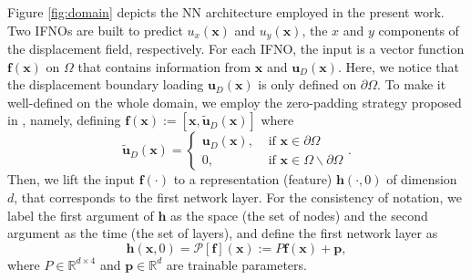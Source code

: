\documentclass[twocolumn,10pt]{asme2ej}
\renewcommand{\~}{\tilde}
\renewcommand{\-}{\bar}
\newcommand{\8}{\infty}
\numberwithin{equation}{section}
\newcommand{\real}{\mathbb{R}}
\def\omg{{\Omega}}
\def \fb{\bm{f}}
\def \ub{\bm{u}}
\def \xb{\bm{x}}
\def \hb{\bm{h}}
\def \pb{\bm{p}}
\begin{document}
    Figure \ref{fig:domain} depicts the NN architecture employed in the present work. Two IFNOs are built to predict $u_x(\xb)$ and $u_y(\xb)$, the $x$ and $y$ components of the displacement field, respectively. For each IFNO, the input is a vector function $\fb(\xb)$ on $\omg$ that contains information from $\xb$ and $\ub_D(\xb)$. Here, we notice that the displacement boundary loading $\ub_D(\xb)$ is only defined on  $\partial\omg$. To make it well-defined on the whole domain, we employ the zero-padding strategy proposed in \cite{lu2021comprehensive}, namely,  defining $\fb(\xb):=[\xb,\tilde{\ub}_D(\xb)]$ where
\begin{equation}\label{eqn:pad}
\tilde{\ub}_D(\xb)=\left\{\begin{array}{cc}
    \ub_D(\xb), & \text{ if }\xb\in\partial\omg \\
    0, &  \text{ if }\xb\in\omg\backslash\partial\omg
\end{array}\right..    
\end{equation}
%
Then, we lift the input $\fb(\cdot)$ to a representation (feature) $\hb(\cdot,0)$ of dimension $d$, that corresponds to the first network layer. For the consistency of notation, we label the first argument of $\hb$ as the space (the set of nodes) and the second argument as the time (the set of layers), and define the first network layer as 
$$\hb(\xb,0)=\mathcal{P}[\fb](\xb):=P\fb(\xb)+\pb,$$
where $P\in\real^{d\times 4}$ and $\pb\in\real^{d}$ are trainable parameters.
\end{document}
